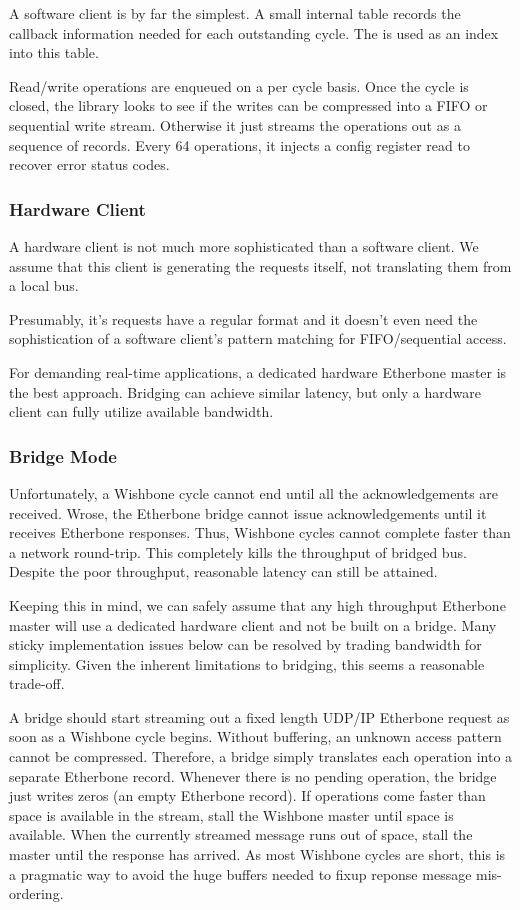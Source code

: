 \documentclass{article}
\begin{document}
A software client is by far the simplest.
A small internal table records the 
callback information needed for each outstanding cycle.
The  is used as an index into this table.

Read/write operations are enqueued on a per cycle basis.
Once the cycle is closed,
the library looks to see if the writes can be compressed into a FIFO or
sequential write stream.
Otherwise it just streams the operations out as a sequence of records.
Every 64 operations, 
it injects a config register read to recover error status codes.

\subsubsection{Hardware Client}

A hardware client is not much more sophisticated than a software client.
We assume that this client is generating the requests itself,
not translating them from a local bus.

Presumably, 
it's requests have a regular format 
and it doesn't even need the sophistication of 
a software client's pattern matching for FIFO/sequential access.

For demanding real-time applications,
a dedicated hardware Etherbone master is the best approach.
Bridging can achieve similar latency,
but only a hardware client can fully utilize available bandwidth.

\subsubsection{Bridge Mode}
\label{sec:bridge}

Unfortunately, 
a Wishbone cycle cannot end until all the acknowledgements are received.
Wrose, the Etherbone bridge cannot issue acknowledgements until 
it receives Etherbone responses.
Thus, Wishbone cycles cannot complete faster than a network round-trip.
This completely kills the throughput of bridged bus.
Despite the poor throughput, 
reasonable latency can still be attained.

Keeping this in mind,
we can safely assume that any high throughput Etherbone master will use 
a dedicated hardware client and not be built on a bridge.
Many sticky implementation issues below can be resolved by 
trading bandwidth for simplicity.
Given the inherent limitations to bridging,
this seems a reasonable trade-off.

A bridge should start streaming out a fixed length UDP/IP Etherbone 
request as soon as a Wishbone cycle begins.
Without buffering,
an unknown access pattern cannot be compressed.
Therefore, 
a bridge simply translates each operation into a separate Etherbone record.
Whenever there is no pending operation,
the bridge just writes zeros (an empty Etherbone record).
If operations come faster than space is available in the stream,
stall the Wishbone master until space is available.
When the currently streamed message runs out of space,
stall the master until the response has arrived.
As most Wishbone cycles are short,
this is a pragmatic way to avoid the huge buffers needed to 
fixup reponse message mis-ordering.
\end{document}

